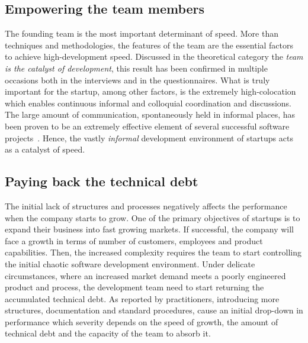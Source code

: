 \documentclass[10pt,journal,letterpaper,compsoc]{IEEEtran}
\begin{document}
\subsection{Empowering the team members} 
The founding team is the most important determinant of speed. More than 
techniques and methodologies, the features of the team are the essential factors 
to achieve high-development speed. Discussed in the theoretical category the 
\textit{team is the catalyst of development}, this result has been confirmed in 
multiple occasions both in the interviews and in the questionnaires. What is 
truly important for the startup, among other factors, is the extremely 
high-colocation which enables continuous informal and colloquial coordination 
and discussions. 
The large amount of communication, spontaneously held in informal places, has 
been proven to be an extremely effective element of several successful software 
projects~\cite{Highsmith2000}. Hence, the vastly \textit{informal} development 
environment of startups acts as a catalyst of speed. 

\subsection{Paying back the technical debt} 
The initial lack of structures and processes negatively affects the 
performance when the company starts to grow.
One of the primary objectives of startups is to expand their business into fast
growing markets. If successful, the company will face a growth in terms of
number of customers, employees and product capabilities. Then, the increased complexity requires the team to start controlling the initial chaotic software development environment. Under delicate circumstances, where an increased
market demand meets a poorly engineered product and process, the development
team need to start returning the accumulated technical debt. As reported by
practitioners, introducing more structures, documentation and standard
procedures, cause an initial drop-down in performance which severity depends on
the speed of growth, the amount of technical debt and the capacity of the team
to absorb it. 
\end{document}
